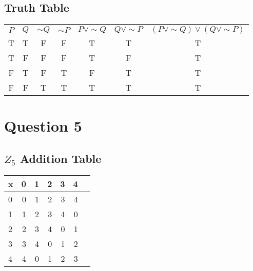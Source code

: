 \documentclass[11pt]{article}
\theoremstyle{plain}
\begin{document}
\subsection{Truth Table}
\begin{center}
\begin{tabular}{ c c c c c c c }
    $P$ & $Q$ & $\sim Q$ & $\sim P$ & $P \lor \sim Q$ & $Q \lor \sim P$ & $(P \lor \sim Q) \lor (Q \lor \sim P )$ \\
    T & T & F & F & T & T & T\\ 
    T & F & F & F & T & F & T\\
    F & T & F & T & F & T & T\\
    F & F & T & T & T & T & T\\
\end{tabular}
\end{center}


\section*{Question 5}


\subsection{$Z_5$ Addition Table}
\begin{center}
\begin{tabular}{lrrrrrr}\toprule
\cellcolor[HTML]{A8A8A8}x &\cellcolor[HTML]{A8A8A8}0 &\cellcolor[HTML]{A8A8A8}1 &\cellcolor[HTML]{A8A8A8}2 &\cellcolor[HTML]{A8A8A8}3 &\cellcolor[HTML]{A8A8A8}4 \\\midrule
\cellcolor[HTML]{A8A8A8}0 &0 &1 &2 &3 &4 \\
\cellcolor[HTML]{A8A8A8}1 &1 &2 &3 &4 &0 \\
\cellcolor[HTML]{A8A8A8}2 &2 &3 &4 &0 &1 \\
\cellcolor[HTML]{A8A8A8}3 &3 &4 &0 &1 &2 \\
\cellcolor[HTML]{A8A8A8}4 &4 &0 &1 &2 &3 \\
\bottomrule
\end{tabular}
\end{center}
\end{document}
